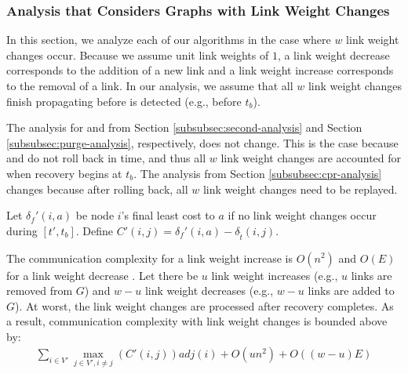 {{\subsubsection{Analysis that Considers Graphs with Link Weight Changes}
\label{subsubsec:linkchange-complex}


In this section, we analyze each of our algorithms in the case where $w$ link weight changes occur.  Because we assume unit link weights of $1$, a link weight decrease corresponds to the 
addition of a new link and a link weight increase corresponds to the removal of a link.  In our analysis, we assume that all $w$ link weight changes finish propagating before \bad is detected 
(e.g., before $t_b$).

The analysis for \second and \purge from Section \ref{subsubsec:second-analysis} and Section \ref{subsubsec:purge-analysis}, respectively, does not change.  This is the 
case because \second and \purge do not roll back in time, and thus all $w$ link weight changes are accounted for when recovery begins at $t_b$.  
The \cpr analysis from Section \ref{subsubsec:cpr-analysis} changes because after rolling back, all $w$ link weight changes need to be replayed. 

Let $\delta_{f}'(i,a)$ be node $i$'s final least cost to $a$ if no link weight changes occur during $[t',t_b]$.  Define 
$C'(i,j) = \delta_{f}'(i,a) - \delta_{\hat{t}}(i,j)$.

The communication complexity for a link weight increase is $O(n^2)$ \cite{Johnson84} and $O(E)$ for a link weight decrease \cite{Johnson84b}.  Let there be $u$ link weight increases (e.g., $u$ links are 
removed from $G$) and $w-u$ link weight decreases (e.g., $w-u$ links are added to $G$).
At worst, the link weight changes are processed after \bad recovery completes. As a result, \cpr communication complexity with link weight changes is bounded above by:
\begin{eqnarray}
\label{thm:cpr-link-change}
\sum_{i \in V'} \max_{j \in V', i \neq j} \left( C'(i,j) \right) adj(i) + O(un^2) + O\left((w-u)E\right)
\end{eqnarray}


}}
